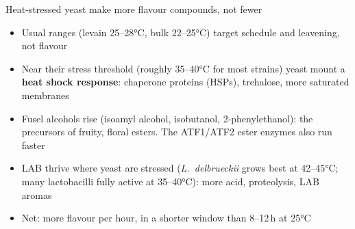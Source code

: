 \documentclass[aspectratio=169,11pt]{beamer}
\begin{document}
\begin{frame}{Heat-stressed yeast make more flavour compounds, not fewer}
  \begin{itemize}
    \item Usual ranges (levain 25–28°C, bulk 22–25°C) target schedule and leavening, not flavour
    \item Near their stress threshold (roughly 35–40°C for most strains) yeast mount a
      \textbf{heat shock response}: chaperone proteins (HSPs), trehalose, more
      saturated membranes
    \item Fusel alcohols rise (isoamyl alcohol, isobutanol, 2-phenylethanol): the
      precursors of fruity, floral esters. The ATF1/ATF2 ester enzymes also run faster
    \item LAB thrive where yeast are stressed (\textit{L.~delbrueckii} grows best at
      42–45°C; many lactobacilli fully active at 35–40°C): more acid, proteolysis, LAB aromas
    \item Net: more flavour per hour, in a shorter window than 8–12\,h at 25°C
  \end{itemize}
\end{frame}
\end{document}
